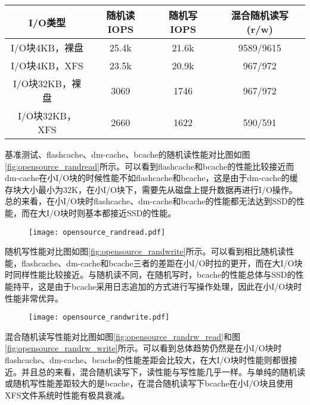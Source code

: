\begin{table}[H]
    \centering
    \begin{tabular}{cccc} 
      \toprule
      I/O类型 & 随机读IOPS & 随机写IOPS & 混合随机读写(r/w) \\ 
      \midrule
      I/O块4KB，裸盘 & 25.4k & 21.6k & 9589/9615 \\
      I/O块4KB，XFS & 23.5k & 20.9k & 967/972 \\
      I/O块32KB，裸盘 & 3069 & 1746 & 967/972 \\
      I/O块32KB，XFS & 2660 & 1622 & 590/591 \\
      \bottomrule
    \end{tabular}
\end{table}

基准测试、flashcache、dm-cache、bcache的随机读性能对比图如图\ref{fig:opensource_randread}所示。可以看到flashcache和bcache的性能比较接近而dm-cache在小I/O块的时候性能不如flashcache和bcache，这是由于dm-cache的缓存块大小最小为32K，在小I/O块下，需要先从磁盘上提升数据再进行I/O操作。总的来看，在小I/O块时flashcache、dm-cache和bcache的性能都无法达到SSD的性能，而在大I/O块时则基本都接近SSD的性能。

\begin{figure}[H]
    \centering
    \texttt{[image: opensource\_randread.pdf]}
\end{figure}

随机写性能对比图如图\ref{fig:opensource_randwrite}所示。可以看到相比随机读性能，flashcache、dm-cache和bcache三者的差距在小I/O时拉的更开，而在大I/O块时同样性能比较接近。与随机读不同，在随机写时，bcache的性能总体与SSD的性能持平，这是由于bcache采用日志追加的方式进行写操作处理，因此在小I/O块时性能非常优异。

\begin{figure}[H]
    \centering
    \texttt{[image: opensource\_randwrite.pdf]}
\end{figure}

混合随机读写性能对比图如图\ref{fig:opensource_randrw_read}和图\ref{fig:opensource_randrw_write}所示。可以看到总体趋势仍然是在小I/O块时flashcache、dm-cache、bcache的性能差距会比较大，在大I/O块时性能则都很接近。并且总的来看，混合随机读写下，读性能与写性能几乎一样。与单纯的随机读或随机写性能差距较大的是bcache，在混合随机读写下bcache在小I/O块且使用XFS文件系统时性能有极具衰减。

